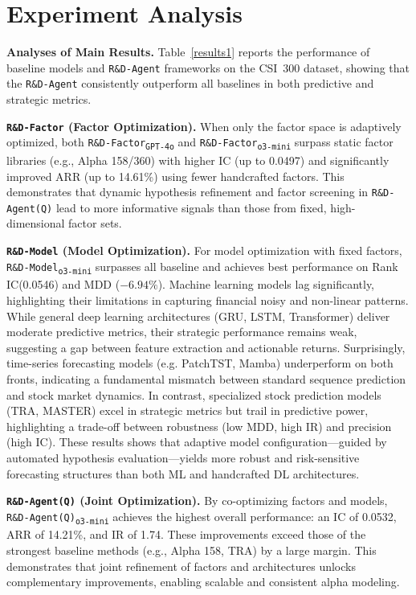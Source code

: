 \documentclass{article}
\newcommand{\name}{\texttt{R\&D-Agent(Q)}}
\begin{document}
\section{Experiment Analysis} \label{sec:results}

\textbf{ Analyses of Main Results.}
% 
Table~\ref{results1} reports the performance of baseline models and \texttt{R\&D-Agent} frameworks on the CSI~300  dataset, showing that the \texttt{R\&D-Agent} consistently outperform all baselines in both predictive and strategic metrics.

\textbf{ \texttt{R\&D-Factor} (Factor Optimization).} When only the factor space is adaptively optimized, both \texttt{R\&D-Factor\textsubscript{GPT-4o}} and \texttt{R\&D-Factor\textsubscript{o3-mini}} surpass static factor libraries (e.g., Alpha 158/360) with higher IC (up to 0.0497) and significantly improved ARR (up to 14.61\%) using fewer handcrafted factors. This demonstrates that dynamic hypothesis refinement and factor screening in \texttt{\name} lead to more informative signals than those from fixed, high-dimensional factor sets.

\textbf{ \texttt{R\&D-Model} (Model Optimization).} For model optimization with fixed factors, \texttt{R\&D-Model\textsubscript{o3-mini}} surpasses all baseline and achieves best performance on Rank IC(0.0546) and MDD ($-6.94\%$). Machine learning models lag significantly, highlighting their limitations in capturing financial noisy and non-linear patterns. While general deep learning architectures (GRU, LSTM, Transformer) deliver moderate predictive metrics, their strategic performance remains weak, suggesting a gap between feature extraction and actionable returns. Surprisingly, time-series forecasting models (e.g. PatchTST, Mamba) underperform on both fronts, indicating a fundamental mismatch between standard sequence prediction and stock market dynamics. In contrast, specialized stock prediction models (TRA, MASTER) excel in strategic metrics but trail in predictive power, highlighting a trade-off between robustness (low MDD, high IR) and precision (high IC). These results shows that adaptive model configuration—guided by automated hypothesis evaluation—yields more robust and risk-sensitive forecasting structures than both ML and handcrafted DL architectures.

\textbf{ \texttt{\name} (Joint Optimization).} By co-optimizing factors and models, \texttt{\name\textsubscript{o3-mini}} achieves the highest overall performance: an IC of 0.0532, ARR of 14.21\%, and IR of 1.74. These improvements exceed those of the strongest baseline methods (e.g., Alpha 158, TRA) by a large margin. This demonstrates that joint refinement of factors and architectures unlocks complementary improvements, enabling scalable and consistent alpha modeling.
\end{document}
